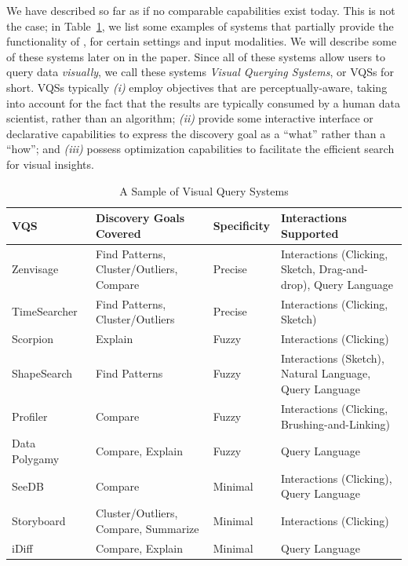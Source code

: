 \par
{}
We have described \vida so far as if no comparable capabilities
exist today.
This is not the case; in Table~\ref{fig:table}, we list some examples of systems
that partially provide the functionality of \vida,
for certain settings and input modalities.
We will describe some of these systems later on in the paper. 
Since all of these systems allow users to query data {\em visually},
we call these systems {\em Visual Querying Systems}, or VQSs for short.
VQSs typically {\em (i)} 
employ objectives that are perceptually-aware,
taking into account for the fact that the results are typically
consumed by a human data scientist, rather than an algorithm;
{\em (ii)} 
provide some interactive interface or declarative capabilities
to express the discovery goal as a ``what'' rather than a ``how'';
and
{\em (iii)}
possess optimization capabilities to facilitate
the efficient search for visual insights. 


\begin{table}[!t]
\scriptsize
\centering
\begin{tabular}{l|l|l|p{7.5cm}}
VQS & Discovery Goals Covered & Specificity & Interactions Supported \\ \hline

Zenvisage~\cite{Lee2017,Siddiqui2016} & Find Patterns, Cluster/Outliers, Compare & Precise & Interactions (Clicking, Sketch, Drag-and-drop), Query Language \\
TimeSearcher~\cite{hochheiser2004dynamic} & Find Patterns, Cluster/Outliers & Precise & Interactions (Clicking, Sketch) \\
Scorpion~\cite{Wu2013} & Explain & Fuzzy & Interactions (Clicking) \\

ShapeSearch~\cite{Siddiqui2018} & Find Patterns & Fuzzy & Interactions (Sketch), Natural Language, Query Language \\
Profiler~\cite{Kandel2012} & Compare & Fuzzy & Interactions (Clicking, Brushing-and-Linking) \\
Data Polygamy~\cite{chirigati2016data} & Compare, Explain & Fuzzy & Query Language \\
SeeDB~\cite{Vartak2015} & Compare & Minimal & Interactions (Clicking), Query Language \\
Storyboard~\cite{Lee2018} & Cluster/Outliers, Compare, Summarize & Minimal & Interactions (Clicking) \\
iDiff~\cite{Sarawagi1998,Sarawagi2000} & Compare, Explain & Minimal & Query Language \\

\end{tabular}
\vspace{-10pt}
\caption{A Sample of Visual Query Systems}\label{fig:table}
\vspace{-10pt}
\end{table}


